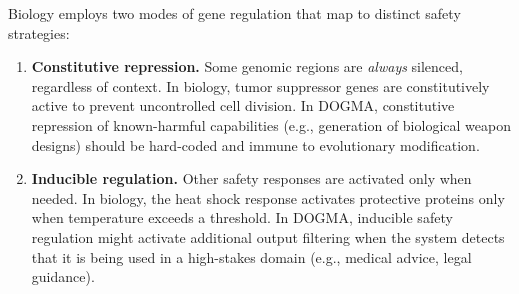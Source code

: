 Biology employs two modes of gene regulation that map to distinct safety strategies:

\begin{enumerate}[leftmargin=1.8em]
  \item \textbf{Constitutive repression.} Some genomic regions are \emph{always} silenced, regardless of context.
  In biology, tumor suppressor genes are constitutively active to prevent uncontrolled cell division.
  In DOGMA, constitutive repression of known-harmful capabilities (e.g., generation of biological weapon designs) should be hard-coded and immune to evolutionary modification.

  \item \textbf{Inducible regulation.} Other safety responses are activated only when needed.
  In biology, the heat shock response activates protective proteins only when temperature exceeds a threshold.
  In DOGMA, inducible safety regulation might activate additional output filtering when the system detects that it is being used in a high-stakes domain (e.g., medical advice, legal guidance).
\end{enumerate}


